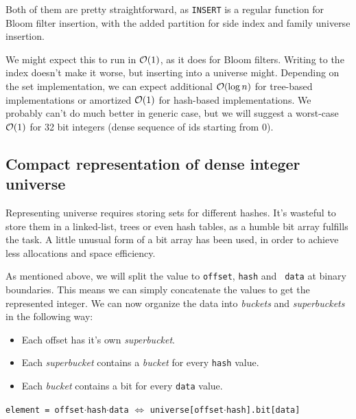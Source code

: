 Both of them are pretty straightforward, as {\tt INSERT} is a regular function
for Bloom filter insertion, with the added partition for side index and family
universe insertion.

We might expect this to run in $\mathcal{O}(1)$, as it does for Bloom filters. Writing to
the index doesn't make it worse, but inserting into a universe might. Depending
on the set implementation, we can expect additional $\mathcal{O}(\log n)$ for tree-based
implementations or amortized $\mathcal{O}(1)$ for hash-based implementations. We probably
can't do much better in generic case, but we will suggest a worst-case $\mathcal{O}(1)$
for 32 bit integers (dense sequence of ids starting from 0).


\subsection{Compact representation of dense integer universe}

Representing universe requires storing sets for different hashes. It's wasteful
to store them in a linked-list, trees or even hash tables, as a humble bit array
fulfills the task. A little unusual form of a bit array has been used, in order
to achieve less allocations and space efficiency.

As mentioned above, we will split the value to {\tt offset}, {\tt hash} and {\tt
data} at binary boundaries. This means we can simply concatenate the values to
get the represented integer. We can now organize the data into {\it buckets} and
{\it superbuckets} in the following way:

\begin{itemize}
	\item Each offset has it's own {\it superbucket}.
	\item Each {\it superbucket} contains a {\it bucket} for every {\tt hash} value.
	\item Each {\it bucket} contains a bit for every {\tt data} value.
\end{itemize}

\begin{center}
	{\tt element = offset$\cdot$hash$\cdot$data} $\Leftrightarrow$
	{\tt universe[offset$\cdot$hash].bit[data]}
\end{center}

